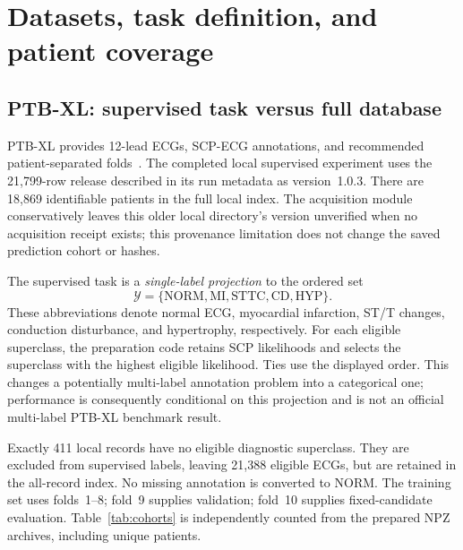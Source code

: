 \documentclass[11pt,a4paper]{article}
\begin{document}
\section{Datasets, task definition, and patient coverage}
\label{sec:data}
\subsection{PTB-XL: supervised task versus full database}
PTB-XL provides 12-lead ECGs, SCP-ECG annotations, and recommended patient-separated folds~\cite{ptbxl,ptbxl_data}. The completed local supervised experiment uses the 21,799-row release described in its run metadata as version~1.0.3. There are 18,869 identifiable patients in the full local index. The acquisition module conservatively leaves this older local directory's version unverified when no acquisition receipt exists; this provenance limitation does not change the saved prediction cohort or hashes.

The supervised task is a \emph{single-label projection} to the ordered set
\begin{equation}
\mathcal{Y}=\{\mathrm{NORM},\mathrm{MI},\mathrm{STTC},\mathrm{CD},\mathrm{HYP}\}.
\end{equation}
These abbreviations denote normal ECG, myocardial infarction, ST/T changes, conduction disturbance, and hypertrophy, respectively. For each eligible superclass, the preparation code retains SCP likelihoods and selects the superclass with the highest eligible likelihood. Ties use the displayed order. This changes a potentially multi-label annotation problem into a categorical one; performance is consequently conditional on this projection and is not an official multi-label PTB-XL benchmark result.

Exactly 411 local records have no eligible diagnostic superclass. They are excluded from supervised labels, leaving 21,388 eligible ECGs, but are retained in the all-record index. No missing annotation is converted to NORM. The training set uses folds~1--8; fold~9 supplies validation; fold~10 supplies fixed-candidate evaluation. Table~\ref{tab:cohorts} is independently counted from the prepared NPZ archives, including unique patients.

\begin{table}[htbp]\centering\small

\caption{Prepared supervised cohorts. Counts are ECGs unless explicitly labeled patients. No patient or record overlaps between these three splits were found.}
\label{tab:cohorts}\end{table}
\end{document}

